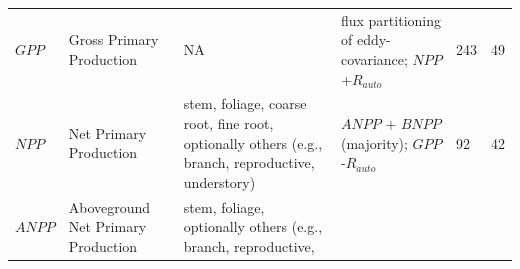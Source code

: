 \documentclass[]{article}
\begin{document}
\begin{longtable}[]{@{}llllll@{}}
\begin{minipage}[t]{0.14\columnwidth}
\(GPP\)\strut
\end{minipage} & \begin{minipage}[t]{0.19\columnwidth}\raggedright\strut
Gross Primary Production\strut
\end{minipage} & \begin{minipage}[t]{0.13\columnwidth}\raggedright\strut
NA\strut
\end{minipage} & \begin{minipage}[t]{0.23\columnwidth}\raggedright\strut
flux partitioning of eddy-covariance; \(NPP\)+\(R_{auto}\)\strut
\end{minipage} & \begin{minipage}[t]{0.07\columnwidth}\raggedright\strut
243\strut
\end{minipage} & \begin{minipage}[t]{0.07\columnwidth}\raggedright\strut
49\strut
\end{minipage}\tabularnewline
\begin{minipage}[t]{0.14\columnwidth}\raggedright\strut
\(NPP\)\strut
\end{minipage} & \begin{minipage}[t]{0.19\columnwidth}\raggedright\strut
Net Primary Production\strut
\end{minipage} & \begin{minipage}[t]{0.13\columnwidth}\raggedright\strut
stem, foliage, coarse root, fine root, optionally others (e.g., branch,
reproductive, understory)\strut
\end{minipage} & \begin{minipage}[t]{0.23\columnwidth}\raggedright\strut
\(ANPP\) + \(BNPP\) (majority); \(GPP\)-\(R_{auto}\)\strut
\end{minipage} & \begin{minipage}[t]{0.07\columnwidth}\raggedright\strut
92\strut
\end{minipage} & \begin{minipage}[t]{0.07\columnwidth}\raggedright\strut
42\strut
\end{minipage}\tabularnewline
\begin{minipage}[t]{0.14\columnwidth}\raggedright\strut
\(ANPP\)\strut
\end{minipage} & \begin{minipage}[t]{0.19\columnwidth}\raggedright\strut
Aboveground Net Primary Production\strut
\end{minipage} & \begin{minipage}[t]{0.13\columnwidth}\raggedright\strut
stem, foliage, optionally others (e.g., branch, reproductive,

\end{minipage}
\end{longtable}
\end{document}
